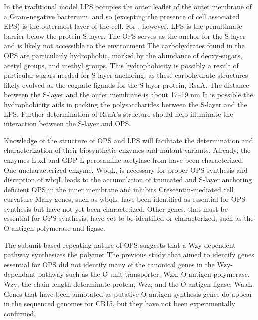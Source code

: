 	In the traditional model \ac{LPS} occupies the outer leaflet of the outer membrane of a Gram-negative bacterium, and so (excepting the presence of cell associated \ac{EPS}) is the outermost layer of the cell. For \caulobacter, however, \ac{LPS} is the penultimate barrier below the protein \ac{S-layer}. The \caulobacter{} \ac{OPS} serves as the anchor for the S-layer and is likely not accessible to the environment The carbohydrates found in the OPS are particularly hydrophobic, marked by the abundance of deoxy-sugars, acetyl groups, and methyl groups. This hydrophobicity is possibly a result of particular sugars needed for \ac{S-layer} anchoring, as these carbohydrate structures likely evolved as the cognate ligands for the \ac{S-layer} protein, RsaA. The distance between the \ac{S-layer} and the outer membrane is about 17--19 nm It is possible the hydrophobicity aids in packing the polysaccharides between the S-layer and the \ac{LPS}. Further determination of RsaA's structure should help illuminate the interaction between the S-layer and \ac{OPS}.

	Knowledge of the structure of \caulobacter{} \ac{OPS} and \ac{LPS} will facilitate the determination and characterization of their biosynthetic enzymes and mutant variants. Already, the enzymes LpxI and GDP-L-perosamine acetylase from \caulobacter have been characterized. One uncharacterized enzyme, WbqL, is necessary for proper \ac{OPS} synthesis and disruption of wbqL leads to the accumulation of truncated and S-layer anchoring deficient \ac{OPS} in the inner membrane and inhibits Crescentin-mediated cell curvature Many genes, such as wbqL, have been identified as essential for \ac{OPS} synthesis but have not yet been characterized. Other genes, that must be essential for \ac{OPS} synthesis, have yet to be identified or characterized, such as the O-antigen polymerase and ligase.


	The subunit-based repeating nature of \caulobacter{} \ac{OPS} suggests that a Wzy-dependent pathway synthesizes the polymer The previous study that aimed to identify genes essential for \ac{OPS} did not identify many of the canonical genes in the Wzy-dependant pathway such as the O-unit transporter, Wzx, O-antigen polymerase, Wzy; the chain-length determinate protein, Wzz; and the O-antigen ligase, WaaL. Genes that have been annotated as putative O-antigen synthesis genes do appear in the sequenced genomes for \caulobacter CB15, but they have not been experimentally confirmed. 

